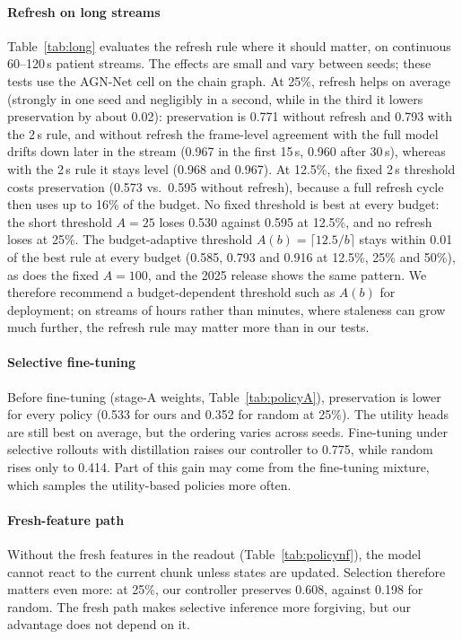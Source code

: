 \paragraph*{Refresh on long streams}
\label{sec:long}
Table~\ref{tab:long} evaluates the refresh rule where it should matter, on continuous 60--120\,s patient streams. The effects are small and vary between seeds; these tests use the AGN-Net cell on the chain graph. At 25\%, refresh helps on average (strongly in one seed and negligibly in a second, while in the third it lowers preservation by about 0.02): preservation is 0.771 without refresh and 0.793 with the 2\,s rule, and without refresh the frame-level agreement with the full model drifts down later in the stream (0.967 in the first 15\,s, 0.960 after 30\,s), whereas with the 2\,s rule it stays level (0.968 and 0.967). At 12.5\%, the fixed 2\,s threshold costs preservation (0.573 vs.\ 0.595 without refresh), because a full refresh cycle then uses up to 16\% of the budget. No fixed threshold is best at every budget: the short threshold $A{=}25$ loses 0.530 against 0.595 at 12.5\%, and no refresh loses at 25\%. The budget-adaptive threshold $A(b)=\lceil 12.5/b\rceil$ stays within 0.01 of the best rule at every budget (0.585, 0.793 and 0.916 at 12.5\%, 25\% and 50\%), as does the fixed $A{=}100$, and the 2025 release shows the same pattern. We therefore recommend a budget-dependent threshold such as $A(b)$ for deployment; on streams of hours rather than minutes, where staleness can grow much further, the refresh rule may matter more than in our tests.

\longtable

\paragraph*{Selective fine-tuning} Before fine-tuning (stage-A weights, Table~\ref{tab:policyA}), preservation is lower for every policy (0.533 for ours and 0.352 for random at 25\%). The utility heads are still best on average, but the ordering varies across seeds. Fine-tuning under selective rollouts with distillation raises our controller to 0.775, while random rises only to 0.414. Part of this gain may come from the fine-tuning mixture, which samples the utility-based policies more often.

\paragraph*{Fresh-feature path} Without the fresh features in the readout (Table~\ref{tab:policynf}), the model cannot react to the current chunk unless states are updated. Selection therefore matters even more: at 25\%, our controller preserves 0.608, against 0.198 for random. The fresh path makes selective inference more forgiving, but our advantage does not depend on it.

